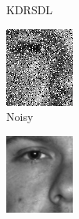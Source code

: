 \begin{figure}
\begin{subfigure}[b]{.19\linewidth}
    \caption{KDRSDL}
\end{subfigure}
\begin{subfigure}[b]{.19\linewidth}
    \includegraphics[width = \linewidth]{Ref/yale_1_03_original}
    \caption{Noisy}
\end{subfigure}
\begin{subfigure}[b]{.19\linewidth}
    \includegraphics[width = \linewidth]{Ref/yale_1_original} 

\end{subfigure}
\end{figure}
